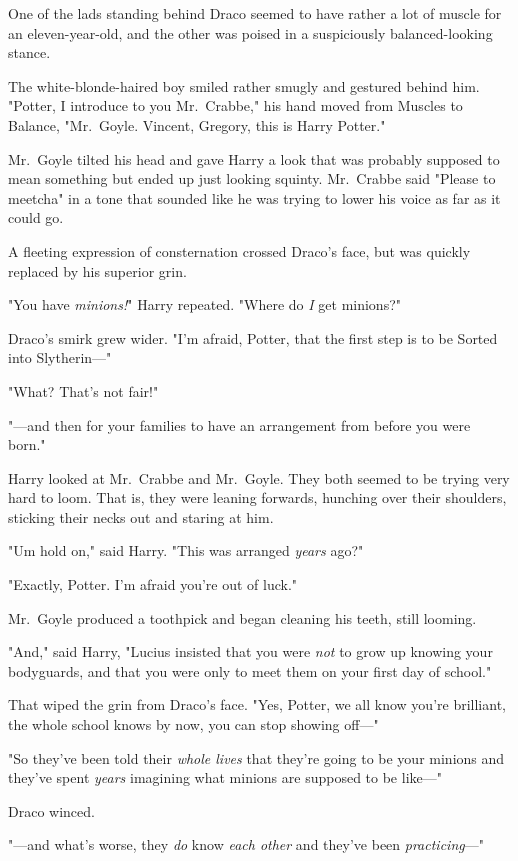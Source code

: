 One of the lads standing behind Draco seemed to have rather a lot of muscle for
an eleven-year-old, and the other was poised in a suspiciously balanced-looking
stance.

The white-blonde-haired boy smiled rather smugly and gestured behind him.
"Potter, I introduce to you Mr.~Crabbe," his hand moved from Muscles to
Balance, "Mr.~Goyle. Vincent, Gregory, this is Harry Potter."

Mr.~Goyle tilted his head and gave Harry a look that was probably supposed to
mean something but ended up just looking squinty. Mr.~Crabbe said "Please to
meetcha" in a tone that sounded like he was trying to lower his voice as far as
it could go.

A fleeting expression of consternation crossed Draco's face, but was quickly
replaced by his superior grin.

"You have \emph{minions!}" Harry repeated. "Where do \emph{I} get minions?"

Draco's smirk grew wider. "I'm afraid, Potter, that the first step is to be
Sorted into Slytherin\mbox{---}"

"What? That's not fair!"

"---and then for your families to have an arrangement from before you were
born."

Harry looked at Mr.~Crabbe and Mr.~Goyle. They both seemed to be trying very
hard to loom. That is, they were leaning forwards, hunching over their
shoulders, sticking their necks out and staring at him.

"Um{\el} hold on," said Harry. "This was arranged \emph{years} ago?"

"Exactly, Potter. I'm afraid you're out of luck."

Mr.~Goyle produced a toothpick and began cleaning his teeth, still looming.

"And," said Harry, "Lucius insisted that you were \emph{not} to grow up knowing
your bodyguards, and that you were only to meet them on your first day of
school."

That wiped the grin from Draco's face. "Yes, Potter, we all know you're
brilliant, the whole school knows by now, you can stop showing off\mbox{---}"

"So they've been told their \emph{whole lives} that they're going to be your
minions and they've spent \emph{years} imagining what minions are supposed to
be like\mbox{---}"

Draco winced.

"---and what's worse, they \emph{do} know \emph{each other} and they've been
\emph{practicing}\mbox{---}"

